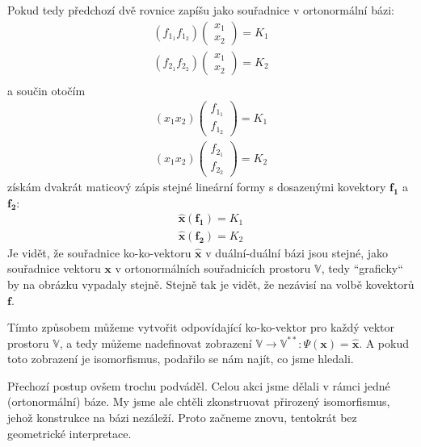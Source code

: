 \documentclass[a5paper,12pt]{amsbook}
\theoremstyle{definition}
\newcommand{\myvec}[1]{\bm{#1}}
\newcommand{\myspace}[1]{\mathbb{#1}}
\newcommand{\mydouble}[1]{\myspace{#1^{**}}}
\newcommand{\mycocovec}[1]{\mathbf{\widehat{#1}}}
\begin{document}
Pokud tedy předchozí dvě rovnice zapíšu jako souřadnice v ortonormální bázi:
\begin{equation*}
\begin{split}
\left(f_{1_1} f_{1_2}\right)\left(\begin{array}{c}
x_1 \\
x_2\end{array}\right) = K_1 \\
\left(f_{2_1} f_{2_2}\right)\left(\begin{array}{c}
x_1 \\
x_2\end{array}\right) = K_2 \\
\end{split}
\end{equation*}
a součin otočím
\begin{equation*}
\begin{split}
\left(x_1 x_2\right)\left(\begin{array}{c}
f_{1_1} \\
f_{1_2}\end{array}\right) = K_1 \\
\left(x_1 x_2\right)\left(\begin{array}{c}
f_{2_1} \\
f_{2_2}\end{array}\right) = K_2
\end{split}
\end{equation*}
získám dvakrát maticový zápis stejné lineární formy s dosazenými kovektory $\myvec{f_1}$ a $\myvec{f_2}$:
\begin{equation*}
\begin{split}
\mycocovec{x}(\myvec{f_1}) = K_1 \\
\mycocovec{x}(\myvec{f_2}) = K_2
\end{split}
\end{equation*}
Je vidět, že souřadnice ko-ko-vektoru $\mycocovec{x}$ v duální-duální bázi jsou stejné, jako souřadnice
vektoru $\myvec{x}$ v ortonormálních souřadnicích prostoru $\myspace{V}$, tedy ``graficky`` by na obrázku
vypadaly stejně. Stejně tak je vidět, že nezávisí na volbě kovektorů $\myvec{f}$.

Tímto způsobem můžeme vytvořit odpovídající ko-ko-vektor pro každý vektor prostoru $\myspace{V}$, a tedy
můžeme nadefinovat zobrazení $\myspace{V}\rightarrow\mydouble{V}: \Psi(\myvec{x}) = \mycocovec{x}$.
A pokud toto zobrazení je isomorfismus, podařilo se nám najít, co jsme hledali.

\medskip\noindent
Přechozí postup ovšem trochu podváděl. Celou akci jsme dělali v rámci jedné (ortonormální) báze. My jsme
ale chtěli zkonstruovat přirozený isomorfismus, jehož konstrukce na bázi nezáleží. Proto začneme znovu,
tentokrát bez geometrické interpretace.
\end{document}

